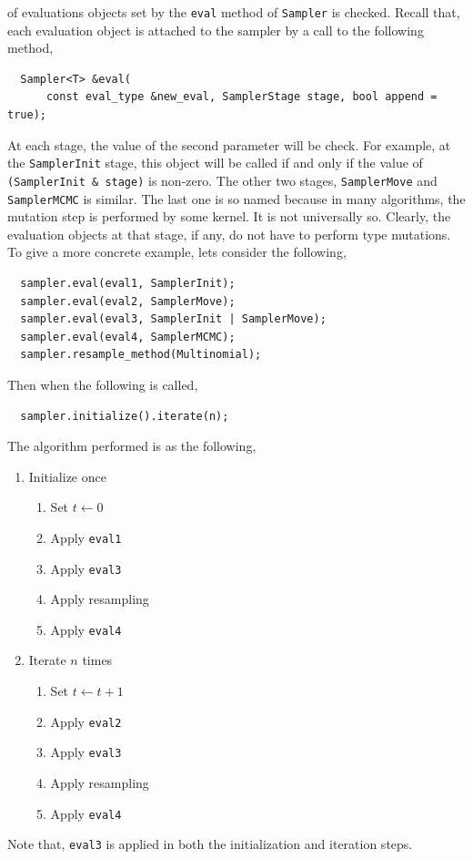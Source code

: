 of evaluations objects set by the \verb|eval| method of \verb|Sampler| is
checked. Recall that, each evaluation object is attached to the sampler by a
call to the following method,
\begin{Verbatim}
  Sampler<T> &eval(
      const eval_type &new_eval, SamplerStage stage, bool append = true);
\end{Verbatim}
At each stage, the value of the second parameter will be check. For example,
at the \verb|SamplerInit| stage, this object will be called if and only if the
value of \verb|(SamplerInit & stage)| is non-zero. The other two stages,
\verb|SamplerMove| and \verb|SamplerMCMC| is similar. The last one is so named
because in many algorithms, the mutation step is performed by some \mcmc
kernel. It is not universally so. Clearly, the evaluation objects at that
stage, if any, do not have to perform \mcmc type mutations. To give a more
concrete example, lets consider the following,
\begin{Verbatim}
  sampler.eval(eval1, SamplerInit);
  sampler.eval(eval2, SamplerMove);
  sampler.eval(eval3, SamplerInit | SamplerMove);
  sampler.eval(eval4, SamplerMCMC);
  sampler.resample_method(Multinomial);
\end{Verbatim}
Then when the following is called,
\begin{Verbatim}
  sampler.initialize().iterate(n);
\end{Verbatim}
The algorithm performed is as the following,
\begin{enumerate}
  \item Initialize once
    \begin{enumerate}
      \item Set $t \leftarrow 0$
      \item Apply \verb|eval1|
      \item Apply \verb|eval3|
      \item Apply resampling
      \item Apply \verb|eval4|
    \end{enumerate}
  \item Iterate $n$ times
    \begin{enumerate}
      \item Set $t \leftarrow t + 1$
      \item Apply \verb|eval2|
      \item Apply \verb|eval3|
      \item Apply resampling
      \item Apply \verb|eval4|
    \end{enumerate}
\end{enumerate}
Note that, \verb|eval3| is applied in both the initialization and iteration
steps.

